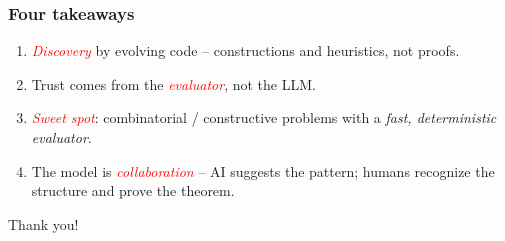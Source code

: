 \documentclass{beamer}
\theoremstyle{definition}
\newcommand\remph[1]{\emph{\textcolor{red}{#1}}}
\begin{document}
\begin{frame}
  \frametitle{Four takeaways}
  \pause
  \begin{enumerate}[label=\textbf{\arabic*.}]
    \item \remph{Discovery} by evolving code -- constructions and
      heuristics, not proofs.
      \pause
      \vspace{.25cm}
    \item Trust comes from the \remph{evaluator}, not the LLM.
      \pause
      \vspace{.25cm}
    \item \remph{Sweet spot}: combinatorial / constructive problems with a
      \emph{fast, deterministic evaluator}.
      \pause
      \vspace{.25cm}
    \item The model is \remph{collaboration} -- AI suggests the pattern;
      humans recognize the structure and prove the theorem.
  \end{enumerate}
\end{frame}


\begin{frame}
  \begin{center}
    \Huge Thank you!

  \end{center}
\end{frame}


\appendix


\section*{}
\end{document}
